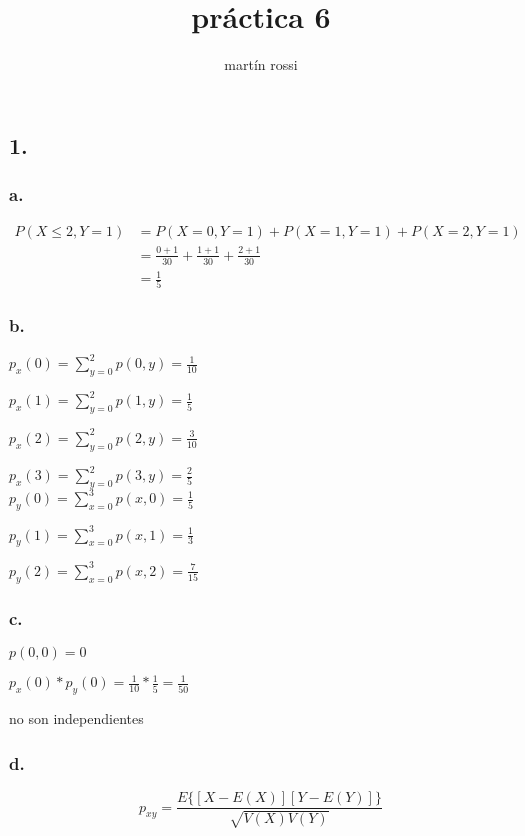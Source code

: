 \documentclass[12pt,fleqn]{article}
\title{práctica 6}
\author{martín rossi}
\date{}
\begin{document}
\maketitle
\subsection*{1.}
\subsubsection*{a.}
\begin{align*}
  P(X\le 2,Y=1)&=P(X=0,Y=1)+P(X=1,Y=1)+P(X=2,Y=1)\\
               &=\frac{0+1}{30}+\frac{1+1}{30}+\frac{2+1}{30}\\
               &=\frac{1}{5}
\end{align*}
\subsubsection*{b.}

$p_x(0)=\sum_{y=0}^2 p(0,y)=\frac{1}{10}$

$p_x(1)=\sum_{y=0}^2 p(1,y)=\frac{1}{5}$

$p_x(2)=\sum_{y=0}^2 p(2,y)=\frac{3}{10}$

$p_x(3)=\sum_{y=0}^2 p(3,y)=\frac{2}{5}$\\

$p_y(0)=\sum_{x=0}^3 p(x,0)=\frac{1}{5}$

$p_y(1)=\sum_{x=0}^3 p(x,1)=\frac{1}{3}$

$p_y(2)=\sum_{x=0}^3 p(x,2)=\frac{7}{15}$
\subsubsection*{c.}

$p(0,0)=0$

$p_x(0)*p_y(0)=\frac{1}{10}*\frac{1}{5}=\frac{1}{50}$

no son independientes
\subsubsection*{d.}
\[p_{xy}=\frac{E\{[X-E(X)][Y-E(Y)]\}}{\sqrt{V(X)V(Y)}}\]
\end{document}
